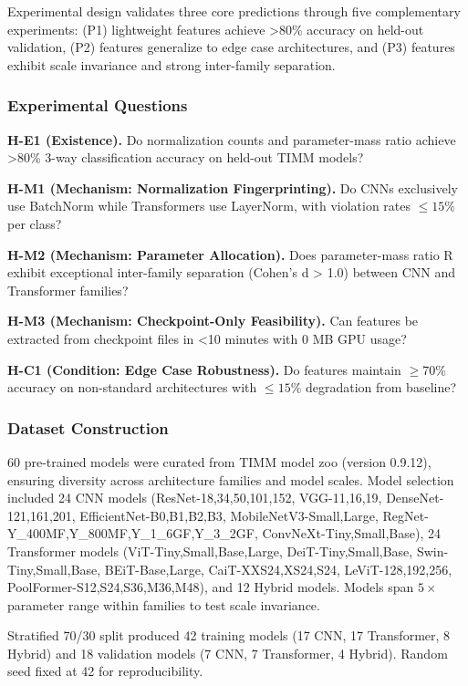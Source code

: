 
Experimental design validates three core predictions through five complementary experiments: (P1) lightweight features achieve >80\% accuracy on held-out validation, (P2) features generalize to edge case architectures, and (P3) features exhibit scale invariance and strong inter-family separation.

\subsubsection{Experimental Questions}

\textbf{H-E1 (Existence).} Do normalization counts and parameter-mass ratio achieve >80\% 3-way classification accuracy on held-out TIMM models?

\textbf{H-M1 (Mechanism: Normalization Fingerprinting).} Do CNNs exclusively use BatchNorm while Transformers use LayerNorm, with violation rates $\leq 15$\% per class?

\textbf{H-M2 (Mechanism: Parameter Allocation).} Does parameter-mass ratio R exhibit exceptional inter-family separation (Cohen's d > 1.0) between CNN and Transformer families?

\textbf{H-M3 (Mechanism: Checkpoint-Only Feasibility).} Can features be extracted from checkpoint files in <10 minutes with 0 MB GPU usage?

\textbf{H-C1 (Condition: Edge Case Robustness).} Do features maintain $\geq 70$\% accuracy on non-standard architectures with $\leq 15$\% degradation from baseline?

\subsubsection{Dataset Construction}

60 pre-trained models were curated from TIMM model zoo (version 0.9.12), ensuring diversity across architecture families and model scales. Model selection included 24 CNN models (ResNet-{18,34,50,101,152}, VGG-{11,16,19}, DenseNet-{121,161,201}, EfficientNet-{B0,B1,B2,B3}, MobileNetV3-{Small,Large}, RegNet-{Y\_400MF,Y\_800MF,Y\_1\_6GF,Y\_3\_2GF}, ConvNeXt-{Tiny,Small,Base}), 24 Transformer models (ViT-{Tiny,Small,Base,Large}, DeiT-{Tiny,Small,Base}, Swin-{Tiny,Small,Base}, BEiT-{Base,Large}, CaiT-{XXS24,XS24,S24}, LeViT-{128,192,256}, PoolFormer-{S12,S24,S36,M36,M48}), and 12 Hybrid models. Models span $5\times$ parameter range within families to test scale invariance.

Stratified 70/30 split produced 42 training models (17 CNN, 17 Transformer, 8 Hybrid) and 18 validation models (7 CNN, 7 Transformer, 4 Hybrid). Random seed fixed at 42 for reproducibility.

